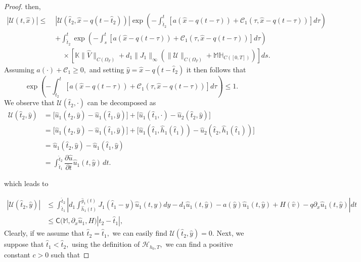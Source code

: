 \documentclass[a4paper,11pt]{amsart}
\theoremstyle{definition}
\numberwithin{equation}{section}
\theoremstyle{definition}
\begin{document}
\begin{proof}
then,
\begin{equation}\label{eq:U_estimate_bound}
\begin{aligned}
|\mathcal{U}(t, \hat{x})| \leq\; & |\mathcal{U}(\hat{t}_2, \hat{x} - q(t - \hat{t}_2))|
\exp\left( -\int_{\hat{t}_2}^t \left[ a(\hat{x} - q(t - \tau)) + \mathcal{C}_1(\tau, \hat{x} - q(t - \tau)) \right] d\tau \right) \\
& + \int_{\hat{t}_2}^t
\exp\left( -\int_s^t \left[ a(\hat{x} - q(t - \tau)) + \mathcal{C}_1(\tau, \hat{x} - q(t - \tau)) \right] d\tau \right) \\
& \quad \times \left[ \mathbb{K} \|\hat{V}\|_{C(\Omega_T)}
+ d_1\|J_1\|_{\infty}\left( \|\mathcal{U}\|_{C(\Omega_T)} + \mathbb{M}\mathbb{H}_{C([0,T])} \right) \right] ds.
\end{aligned}
\end{equation}
Assuming $a(\cdot) + \mathcal{C}_1 \geq 0,$ and setting $\hat{y}=\hat{x} - q(t - \hat{t}_2)$ it then follows that \begin{equation*}\exp\left( -\int_{\hat{t}_2}^t \left[ a(\hat{x} - q(t - \tau)) + \mathcal{C}_1(\tau, \hat{x} - q(t - \tau)) \right] d\tau \right) \leq 1. \end{equation*}We observe that $\mathcal{U}(\hat{t}_2, \cdot)$ can be decomposed as
\begin{align}
\mathcal{U}(\hat{t}_2, \hat{y}) &= \big[\hat{u}_1(\hat{t}_2, \hat{y}) - \hat{u}_1(\hat{t}_1, \hat{y})\big] + \big[\hat{u}_1(\hat{t}_1, \cdot) - \hat{u}_2(\hat{t}_2, \hat{y})\big] \nonumber \\
&= \big[\hat{u}_1(\hat{t}_2, \hat{y}) - \hat{u}_1(\hat{t}_1, \hat{y})\big] + \big[\hat{u}_1(\hat{t}_1, \hat{h}_1(\hat{t}_1)) - \hat{u}_2(\hat{t}_2, \hat{h}_1(\hat{t}_1))\big] \nonumber \\
&= \hat{u}_1(\hat{t}_2, \hat{y}) - \hat{u}_1(\hat{t}_1, \hat{y}) \nonumber \\
&= \displaystyle\int_{\hat{t}_1}^{\hat{t}_2} \dfrac{\partial \hat{u}}{\partial t} \hat{u}_1(t, \hat{y}) \, dt.
\end{align}

 which leads to

 \begin{equation}
 \begin{aligned}
|\mathcal{U}(\hat{t}_2, \hat{y})| &\leq \int_{\hat{t}_1}^{\hat{t}_2} \left| d_1 \int_{\hat{h}_1(t)}^{\hat{g}_1(t)} J_1(\hat{t}_1-y)\hat{u}_1(t,y) dy - d_1\hat{u}_1(t,\hat{y}) -a(\hat{y}) \hat{u}_1(t,\hat{y}) + H(\hat{v}) - q  \partial_x \hat{u}_1(t,\hat{y})  \right| dt\\
&\leq \mathsf{C}\big( \mathbb{M}, \partial_x \hat{u}_1 ,  H\big) |\hat{t}_2- \hat{t}_1|,
\end{aligned}
\end{equation}
Clearly, if we assume that $\hat{t}_2= \hat{t}_1,$ we can easily find $\mathcal{U}(\hat{t}_2, \hat{y})=0.$ Next, we suppose that $ \hat{t}_1 < \hat{t}_2,$ using the definition of $\mathcal{H}_{h_0, T},$ we can find a positive constant $c>0$ such that


\end{proof}
\end{document}
